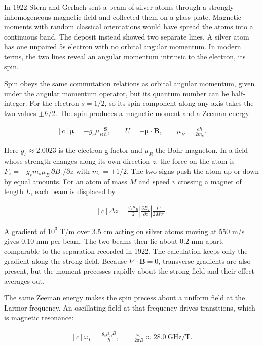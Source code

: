 \documentclass[11pt,oneside]{book}
\newenvironment{centeredalign}{\[\begin{gathered}[c]}{\end{gathered}\]}
\begin{document}
\label{topic:spin-physics}

In 1922 Stern and Gerlach sent a beam of silver atoms through a strongly inhomogeneous magnetic field and collected them on a glass plate. Magnetic moments with random classical orientations would have spread the atoms into a continuous band. The deposit instead showed two separate lines. A silver atom has one unpaired 5s electron with no orbital angular momentum. In modern terms, the two lines reveal an angular momentum intrinsic to the electron, its spin.

Spin obeys the same commutation relations as orbital angular momentum, given under the angular momentum operator, but its quantum number can be half-integer. For the electron \(s=1/2\), so its spin component along any axis takes the two values \(\pm\hbar/2\). The spin produces a magnetic moment and a Zeeman energy:

\begin{centeredalign}
\boldsymbol\mu=-g_s\mu_B\frac{\mathbf S}{\hbar},\qquad U=-\boldsymbol\mu\cdot\mathbf B,
\qquad \mu_B=\frac{e\hbar}{2m_e}.
\end{centeredalign}

Here \(g_s\approx2.0023\) is the electron g-factor and \(\mu_B\) the Bohr magneton. In a field whose strength changes along its own direction \(z\), the force on the atom is \(F_z=-g_sm_s\mu_B\,\partial B_z/\partial z\) with \(m_s=\pm1/2\). The two signs push the atom up or down by equal amounts. For an atom of mass \(M\) and speed \(v\) crossing a magnet of length \(L\), each beam is displaced by

\begin{centeredalign}
\Delta z=\frac{g_s\mu_B}{2}\left|\frac{\partial B_z}{\partial z}\right|\frac{L^2}{2Mv^2}.
\end{centeredalign}

A gradient of \(10^3\) T/m over 3.5 cm acting on silver atoms moving at 550 m/s gives 0.10 mm per beam. The two beams then lie about 0.2 mm apart, comparable to the separation recorded in 1922. The calculation keeps only the gradient along the strong field. Because \(\nabla\cdot\mathbf B=0\), transverse gradients are also present, but the moment precesses rapidly about the strong field and their effect averages out.

The same Zeeman energy makes the spin precess about a uniform field at the Larmor frequency. An oscillating field at that frequency drives transitions, which is magnetic resonance:

\begin{centeredalign}
\omega_L=\frac{g_s\mu_BB}{\hbar},\qquad \frac{\omega_L}{2\pi B}\approx28.0\ \mathrm{GHz/T}.
\end{centeredalign}
\end{document}
